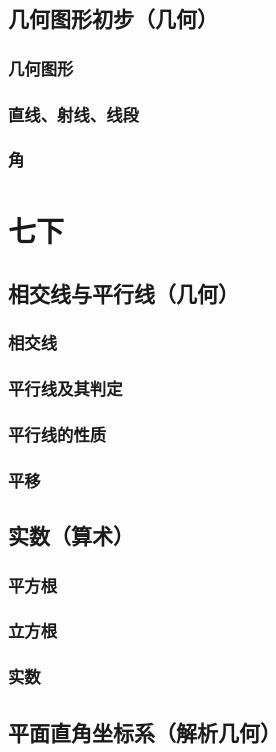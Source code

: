 \documentclass[cn,blue,10pt]{elegantbook}
\begin{document}
\chapter{几何图形初步（几何）}
\section{几何图形}
\section{直线、射线、线段}
\section{角}
\part{七下}
\chapter{相交线与平行线（几何）}
\section{相交线}
\section{平行线及其判定}
\section{平行线的性质}
\section{平移}
\chapter{实数（算术）}
\section{平方根}
\section{立方根}
\section{实数}
\chapter{平面直角坐标系（解析几何）}
\end{document}
